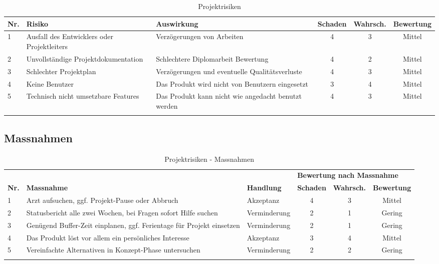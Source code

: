 \begin{longtable}[]{@{}lp{3cm}p{4cm}ccc@{}}
  \toprule
  \textbf{Nr.} & \textbf{Risiko}                             & \textbf{Auswirkung}                                 & \textbf{Schaden} & \textbf{Wahrsch.} & \textbf{Bewertung}\tabularnewline
  \midrule
  \endhead
  1            & Ausfall des Entwicklers oder Projektleiters & Verzögerungen von Arbeiten                          & 4                & 3                 & Mittel\tabularnewline
  2            & Unvollständige Projektdokumentation         & Schlechtere Diplomarbeit Bewertung                  & 4                & 2                 & Mittel\tabularnewline
  3            & Schlechter Projektplan                      & Verzögerungen und eventuelle Qualitätsverluste      & 4                & 3                 & Mittel\tabularnewline
  4            & Keine Benutzer                              & Das Produkt wird nicht von Benutzern eingesetzt     & 3                & 4                 & Mittel\tabularnewline
  5            & Technisch nicht umsetzbare Features         & Das Produkt kann nicht wie angedacht benutzt werden & 4                & 3                 & Mittel\tabularnewline
  \bottomrule
  \caption{Projektrisiken}
\end{longtable}

\clearpage
\subsection{Massnahmen}\label{massnahmen}

\begin{longtable}[]{@{}lp{4.1cm}lccc@{}}
  \toprule
               &                                                                       &                   & \multicolumn{3}{l}{\textbf{Bewertung nach Massnahme}}\tabularnewline
  \textbf{Nr.} & \textbf{Massnahme}                                                    & \textbf{Handlung} & \textbf{Schaden}                                                     & \textbf{Wahrsch.} & \textbf{Bewertung}\tabularnewline
  \midrule
  \endhead
  1            & Arzt aufsuchen, ggf. Projekt-Pause oder Abbruch                       & Akzeptanz         & 4                                                                    & 3                 & Mittel\tabularnewline
  2            & Statusbericht alle zwei Wochen, bei Fragen sofort Hilfe suchen        & Verminderung      & 2                                                                    & 1                 & Gering\tabularnewline
  3            & Genügend Buffer-Zeit einplanen, ggf. Ferientage für Projekt einsetzen & Verminderung      & 2                                                                    & 1                 & Gering\tabularnewline
  4            & Das Produkt löst vor allem ein persönliches Interesse                 & Akzeptanz         & 3                                                                    & 4                 & Mittel\tabularnewline
  5            & Vereinfachte Alternativen in Konzept-Phase untersuchen                & Verminderung      & 2                                                                    & 2                 & Gering\tabularnewline
  \bottomrule
  \caption{Projektrisiken - Massnahmen}
\end{longtable}

